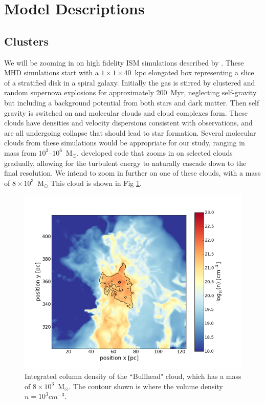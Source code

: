 \documentclass[11pt]{article}
\newcommand{\msun}{$\textrm{M}_{\odot}$}
\begin{document}
\section{Model Descriptions}
\subsection{Clusters}

We will be zooming in on high fidelity ISM simulations described by \citet{Ibanez-Mejia2016}. These MHD simulations start with a $1\times 1\times 40$~kpc elongated box representing a slice of a stratified disk in a spiral galaxy. Initially the gas is stirred by clustered and random supernova explosions for approximately 200~Myr, neglecting self-gravity but including a background potential from both stars and dark matter. Then %
self gravity
    is
switched on and molecular clouds and cloud complexes form. These clouds have densities and velocity dispersions consistent with observations, 
     and are all 
undergoing collapse that should lead to star formation. Several molecular clouds from these simulations would be appropriate for our study, ranging in mass from %
$10^3$--$10^6$~\msun.  \citet{Ibanez-Mejia2016b} developed code that zooms in on selected clouds gradually, allowing for the turbulent energy to naturally cascade down to the final resolution. We intend to zoom in further on %
     one 
of these clouds, with a mass of 
$8 \times 10^3$~{\msun} 
This cloud is shown in Fig \ref{fig:bullhead}.

\begin{figure}
\centering
\includegraphics[width=0.7\linewidth]{bullhead_mod}
\caption{Integrated column density of the ``Bullhead" cloud, which has a mass of $8 \times 10^3$~{\msun}. The contour shown is where the volume density $n=10^3 \si{cm^{-3}}$.}
\label{fig:bullhead}
\end{figure}
\end{document}
